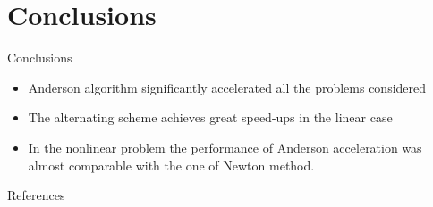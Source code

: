 \documentclass{beamer}
\begin{document}
				\section{Conclusions}
				\begin{frame}{Conclusions}
					\begin{itemize}
					\item	Anderson algorithm significantly accelerated all the problems considered
					\item The alternating scheme \cite{Pratapa} achieves great speed-ups in the linear case
					\item In the nonlinear problem the performance of Anderson acceleration was almost
						comparable with the one of Newton method.
					\end{itemize}
				\end{frame}
				
				\begin{frame}{References}
					\printbibliography[heading=bibintoc]
				\end{frame}
				
			
			
\end{document}
